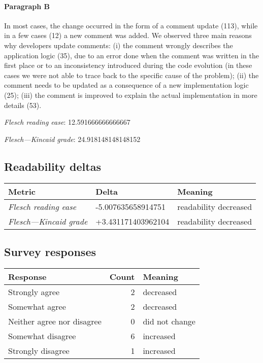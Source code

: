 \paragraph{Paragraph B}
In most cases, the change occurred in the form of a comment update (113), while in a few cases (12) a new comment was added. We observed three main reasons why developers update comments: (i) the comment wrongly describes the application logic (35), due to an error done when the comment was written in the first place or to an inconsistency introduced during the code evolution (in these cases we were not able to trace back to the specific cause of the problem); (ii) the comment needs to be updated as a consequence of a new implementation logic (25); (iii) the comment is improved to explain the actual implementation in more details (53).\par\medskip\emph{Flesch reading ease}: 12.591666666666667\par\emph{Flesch---Kincaid grade}: 24.918148148148152

\subsection{Readability deltas}

\begin{tabular}{lll}
\toprule
               \textbf{Metric} &      \textbf{Delta} &       \textbf{Meaning} \\
\midrule
    \emph{Flesch reading ease} &  -5.007635658914751 &  readability decreased \\
 \emph{Flesch---Kincaid grade} &  +3.431171403962104 &  readability decreased \\
\bottomrule
\end{tabular}

\subsection{Survey responses}
\begin{tabular}{lrl}
\toprule
          \textbf{Response} &  \textbf{Count} & \textbf{Meaning} \\
\midrule
             Strongly agree &               2 &        decreased \\
             Somewhat agree &               2 &        decreased \\
 Neither agree nor disagree &               0 &   did not change \\
          Somewhat disagree &               6 &        increased \\
          Strongly disagree &               1 &        increased \\
\bottomrule
\end{tabular}

